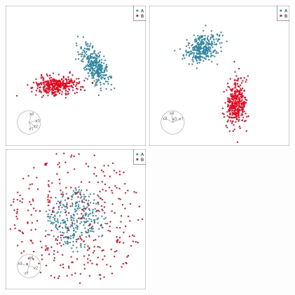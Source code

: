 \documentclass[
  letterpaper,
]{krantz}
\begin{document}
\begin{figure}

\begin{minipage}{0.50\linewidth}

\includegraphics[width=2.08333in,height=\textheight,keepaspectratio]{images/intro_class1.png}

\end{minipage}%
%
\begin{minipage}{0.50\linewidth}

\includegraphics[width=2.08333in,height=\textheight,keepaspectratio]{images/intro_class2.png}

\end{minipage}%
\newline
\begin{minipage}{0.50\linewidth}

\includegraphics[width=2.08333in,height=\textheight,keepaspectratio]{images/intro_class3.png}


\end{minipage}
\end{figure}
\end{document}
